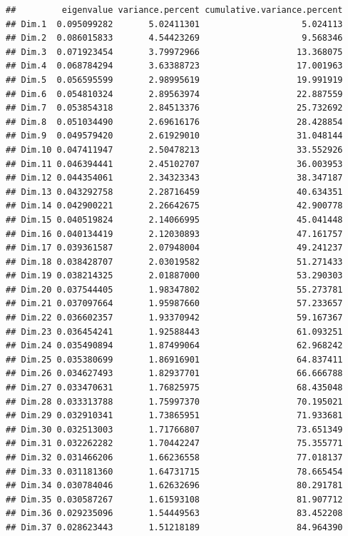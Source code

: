 \documentclass[11pt,]{article}
\begin{document}
\begin{verbatim}
##         eigenvalue variance.percent cumulative.variance.percent
## Dim.1  0.095099282       5.02411301                    5.024113
## Dim.2  0.086015833       4.54423269                    9.568346
## Dim.3  0.071923454       3.79972966                   13.368075
## Dim.4  0.068784294       3.63388723                   17.001963
## Dim.5  0.056595599       2.98995619                   19.991919
## Dim.6  0.054810324       2.89563974                   22.887559
## Dim.7  0.053854318       2.84513376                   25.732692
## Dim.8  0.051034490       2.69616176                   28.428854
## Dim.9  0.049579420       2.61929010                   31.048144
## Dim.10 0.047411947       2.50478213                   33.552926
## Dim.11 0.046394441       2.45102707                   36.003953
## Dim.12 0.044354061       2.34323343                   38.347187
## Dim.13 0.043292758       2.28716459                   40.634351
## Dim.14 0.042900221       2.26642675                   42.900778
## Dim.15 0.040519824       2.14066995                   45.041448
## Dim.16 0.040134419       2.12030893                   47.161757
## Dim.17 0.039361587       2.07948004                   49.241237
## Dim.18 0.038428707       2.03019582                   51.271433
## Dim.19 0.038214325       2.01887000                   53.290303
## Dim.20 0.037544405       1.98347802                   55.273781
## Dim.21 0.037097664       1.95987660                   57.233657
## Dim.22 0.036602357       1.93370942                   59.167367
## Dim.23 0.036454241       1.92588443                   61.093251
## Dim.24 0.035490894       1.87499064                   62.968242
## Dim.25 0.035380699       1.86916901                   64.837411
## Dim.26 0.034627493       1.82937701                   66.666788
## Dim.27 0.033470631       1.76825975                   68.435048
## Dim.28 0.033313788       1.75997370                   70.195021
## Dim.29 0.032910341       1.73865951                   71.933681
## Dim.30 0.032513003       1.71766807                   73.651349
## Dim.31 0.032262282       1.70442247                   75.355771
## Dim.32 0.031466206       1.66236558                   77.018137
## Dim.33 0.031181360       1.64731715                   78.665454
## Dim.34 0.030784046       1.62632696                   80.291781
## Dim.35 0.030587267       1.61593108                   81.907712
## Dim.36 0.029235096       1.54449563                   83.452208
## Dim.37 0.028623443       1.51218189                   84.964390

\end{verbatim}
\end{document}
